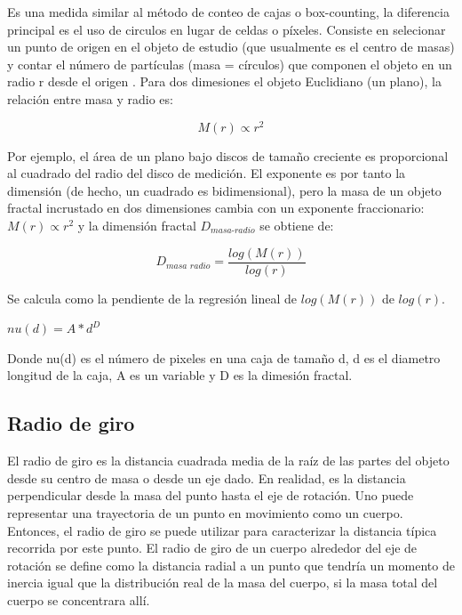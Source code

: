 \documentclass[11pt]{article}
\begin{document}
Es una medida similar al método de conteo de cajas o box-counting, la diferencia principal es el uso de circulos en lugar de celdas o píxeles. Consiste en selecionar un punto de origen en el objeto de estudio (que usualmente es el centro de masas) y contar el número de partículas (masa = círculos) que componen 	el objeto en un radio r desde el origen \cite{Mustafa1996}. Para dos dimesiones el objeto Euclidiano (un plano), la relación entre masa y radio es:

\begin{equation}
M(r) \propto r^{2}
\end{equation}


Por ejemplo, el área de un plano bajo discos de tamaño creciente es proporcional al cuadrado del radio del disco de medición. El exponente es por tanto la dimensión (de hecho, un cuadrado es bidimensional), pero la masa de un objeto fractal incrustado en dos dimensiones cambia con un exponente fraccionario: $M(r) \propto r^{2}$ y la dimensión fractal $D_\textit{{masa-radio}}$ se obtiene de:

\begin{equation}
D_\textit{masa radio} = \frac{log (M(r))}{log (r)}
\end{equation}

Se calcula como la pendiente de la regresión lineal de $log(M(r))$ de $log(r)$.



$nu(d) = A*d^D$

Donde nu(d) es el número de pixeles en una caja de tamaño d, d es el diametro longitud de la caja, A es un variable y D es la dimesión fractal. 

\clearpage


\subsection{Radio de giro}

El radio de giro es la distancia cuadrada media de la raíz de las partes del objeto desde su centro de masa o desde un eje dado. En realidad, es la distancia perpendicular desde la masa del punto hasta el eje de rotación. Uno puede representar una trayectoria de un punto en movimiento como un cuerpo. Entonces, el radio de giro se puede utilizar para caracterizar la distancia típica recorrida por este punto. El radio de giro de un cuerpo alrededor del eje de rotación se define como la distancia radial a un punto que tendría un momento de inercia igual que la distribución real de la masa del cuerpo, si la masa total del cuerpo se concentrara allí.
\end{document}
